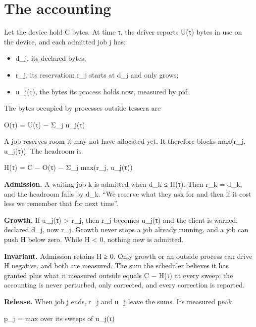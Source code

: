 \section{\texorpdfstring{The accounting}{The accounting}}

Let the device hold C bytes. At time τ, the driver reports U(τ) bytes in use on the device, and each admitted job j has:

\begin{itemize}
\item d\_\allowbreak{}j, its declared bytes;
\item r\_\allowbreak{}j, its reservation: r\_\allowbreak{}j starts at d\_\allowbreak{}j and only grows;
\item u\_\allowbreak{}j(τ), the bytes its process holds now, measured by pid.
\end{itemize}

The bytes occupied by processes outside tessera are

O(τ) = U(τ) − Σ\_\allowbreak{}j u\_\allowbreak{}j(τ)

A job reserves room it may not have allocated yet. It therefore blocks max(r\_\allowbreak{}j, u\_\allowbreak{}j(τ)). The headroom is

H(τ) = C − O(τ) − Σ\_\allowbreak{}j max(r\_\allowbreak{}j, u\_\allowbreak{}j(τ))

\textbf{Admission.} A waiting job k is admitted when d\_\allowbreak{}k ≤ H(τ). Then r\_\allowbreak{}k = d\_\allowbreak{}k, and the headroom falls by d\_\allowbreak{}k. “We reserve what they ask for and then if it cost less we remember that for next time”.

\textbf{Growth.} If u\_\allowbreak{}j(τ) > r\_\allowbreak{}j, then r\_\allowbreak{}j becomes u\_\allowbreak{}j(τ) and the client is warned: declared d\_\allowbreak{}j, now r\_\allowbreak{}j. Growth never stops a job already running, and a job can push H below zero. While H < 0, nothing new is admitted.

\textbf{Invariant.} Admission retains H ≥ 0. Only growth or an outside process can drive H negative, and both are measured. The sum the scheduler believes it has granted plus what it measured outside equals C − H(τ) at every sweep: the accounting is never perturbed, only corrected, and every correction is reported.

\textbf{Release.} When job j ends, r\_\allowbreak{}j and u\_\allowbreak{}j leave the sums. Its measured peak

p\_\allowbreak{}j = max over its sweeps of u\_\allowbreak{}j(τ)

